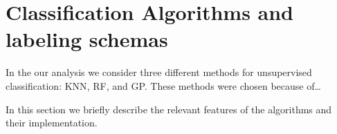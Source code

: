 \section{Classification Algorithms and labeling schemas\label{algos}}

In the our analysis we consider three different methods for unsupervised classification: \ac{KNN}, \ac{RF}, and \ac{GP}. These methods were chosen because of\dots {}

In this section we briefly describe the relevant features of the algorithms and their implementation. 








